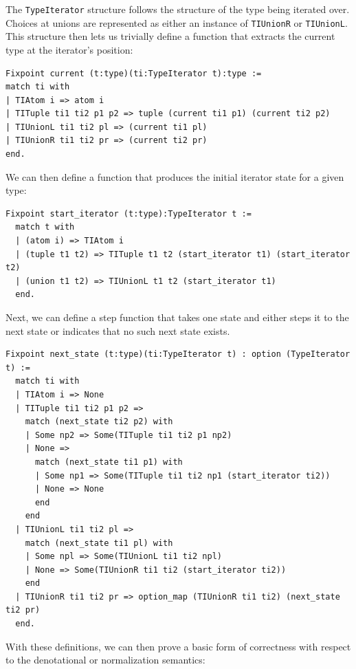 \documentclass[a4paper,english]{lipics-v2019}
\begin{document}
The \verb|TypeIterator| structure follows the structure of the type being
iterated over. Choices at unions are represented as either an instance of
\verb|TIUnionR| or \verb|TIUnionL|. This structure then lets us trivially
define a function that extracts the current type at the iterator's position:

\begin{small}\begin{verbatim}
Fixpoint current (t:type)(ti:TypeIterator t):type :=
match ti with
| TIAtom i => atom i
| TITuple ti1 ti2 p1 p2 => tuple (current ti1 p1) (current ti2 p2)
| TIUnionL ti1 ti2 pl => (current ti1 pl)
| TIUnionR ti1 ti2 pr => (current ti2 pr)
end.
\end{verbatim}
\end{small}

\noindent We can then define a function that produces the initial iterator state for a
given type:

\begin{small}
\begin{verbatim}
Fixpoint start_iterator (t:type):TypeIterator t :=
  match t with
  | (atom i) => TIAtom i
  | (tuple t1 t2) => TITuple t1 t2 (start_iterator t1) (start_iterator t2)
  | (union t1 t2) => TIUnionL t1 t2 (start_iterator t1)
  end.
\end{verbatim}
\end{small}

\noindent Next, we can define a step function that takes one state and either steps it
to the next state or indicates that no such next state exists.

\begin{small}\begin{verbatim}
Fixpoint next_state (t:type)(ti:TypeIterator t) : option (TypeIterator t) :=
  match ti with
  | TIAtom i => None
  | TITuple ti1 ti2 p1 p2 =>
    match (next_state ti2 p2) with
    | Some np2 => Some(TITuple ti1 ti2 p1 np2)
    | None =>
      match (next_state ti1 p1) with
      | Some np1 => Some(TITuple ti1 ti2 np1 (start_iterator ti2))
      | None => None
      end
    end
  | TIUnionL ti1 ti2 pl =>
    match (next_state ti1 pl) with
    | Some npl => Some(TIUnionL ti1 ti2 npl)
    | None => Some(TIUnionR ti1 ti2 (start_iterator ti2))
    end
  | TIUnionR ti1 ti2 pr => option_map (TIUnionR ti1 ti2) (next_state ti2 pr)
  end.
\end{verbatim}\end{small}

With these definitions, we can then prove a basic form of correctness with
respect to the denotational or normalization semantics:
\end{document}
